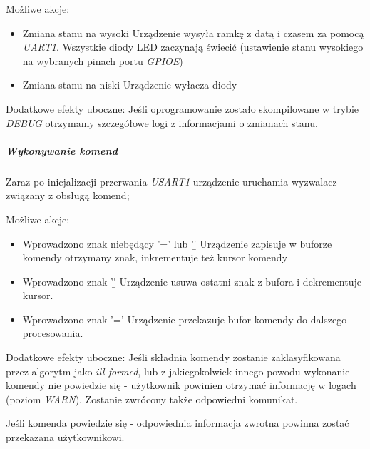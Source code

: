 \documentclass{article}
\begin{document}
Możliwe akcje:
\begin{itemize}
    \item Zmiana stanu na wysoki\newline
    Urządzenie wysyła ramkę z datą i czasem za pomocą \emph{UART1}. Wszystkie diody LED
    zaczynają świecić (ustawienie stanu wysokiego na wybranych pinach portu \emph{GPIOE})

    \item Zmiana stanu na niski\newline
    Urządzenie wyłacza diody
\end{itemize}

Dodatkowe efekty uboczne:
Jeśli oprogramowanie zostało skompilowane w trybie \emph{DEBUG} otrzymamy szczegółowe
logi z informacjami o zmianach stanu.

\subparagraph{Wykonywanie komend}
Zaraz po inicjalizacji przerwania \emph{USART1} urządzenie uruchamia wyzwalacz związany
z obsługą komend;

Możliwe akcje:
\begin{itemize}
   \item Wprowadzono znak niebędący '=' lub '\b'\newline
   Urządzenie zapisuje w buforze komendy otrzymany znak, inkrementuje też
   kursor komendy
   \item Wprowadzono znak '\b'\newline
   Urządzenie usuwa ostatni znak z bufora i dekrementuje kursor.
   \item Wprowadzono znak '='\newline
   Urządzenie przekazuje bufor komendy do dalszego procesowania.
\end{itemize}

Dodatkowe efekty uboczne:
Jeśli składnia komendy zostanie zaklasyfikowana przez algorytm jako \emph{ill-formed},
lub z jakiegokolwiek innego powodu wykonanie komendy nie powiedzie się - użytkownik powinien
otrzymać informację w logach (poziom \emph{WARN}). Zostanie zwrócony także odpowiedni komunikat.

Jeśli komenda powiedzie się - odpowiednia informacja zwrotna powinna zostać przekazana
użytkownikowi.

\end{document}
